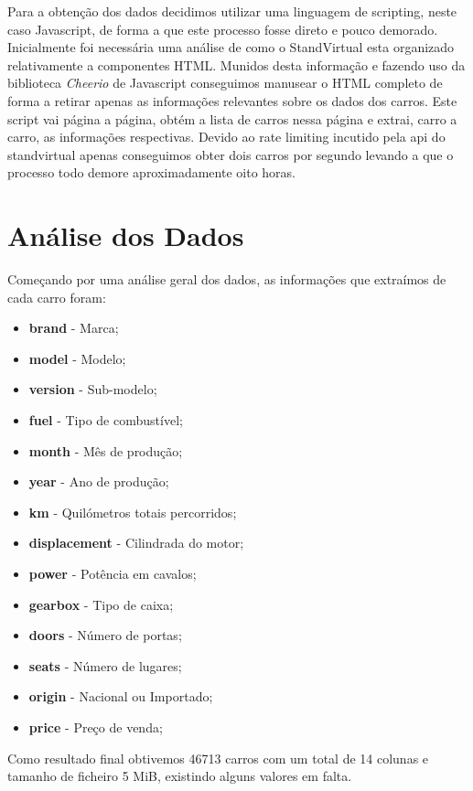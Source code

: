 \documentclass[a4paper]{report}
\begin{document}
Para a obtenção dos dados decidimos utilizar uma linguagem de scripting, neste caso Javascript,
de forma a que este processo fosse direto e pouco demorado. 
Inicialmente foi necessária uma análise de como o StandVirtual esta organizado 
relativamente a componentes HTML. Munidos desta informação e fazendo uso da biblioteca 
\textit{Cheerio} de Javascript conseguimos manusear o HTML completo de forma a retirar
apenas as informações relevantes sobre os dados dos carros.
Este script vai página a página, obtém a lista de carros nessa página e extrai,
carro a carro, as informações respectivas. Devido ao rate limiting incutido pela api do
standvirtual apenas conseguimos obter dois carros por segundo levando a que o processo todo
demore aproximadamente oito horas.

\section{Análise dos Dados}

Começando por uma análise geral dos dados, as informações que extraímos de cada carro
foram:
\begin{itemize}
    \item \textbf{brand} - Marca;
    \item \textbf{model} - Modelo;
    \item \textbf{version} - Sub-modelo;
    \item \textbf{fuel} - Tipo de combustível;
    \item \textbf{month} - Mês de produção;
    \item \textbf{year} - Ano de produção;
    \item \textbf{km} - Quilómetros totais percorridos;
    \item \textbf{displacement} - Cilindrada do motor;
    \item \textbf{power} - Potência em cavalos;
    \item \textbf{gearbox} - Tipo de caixa;
    \item \textbf{doors} - Número de portas;
    \item \textbf{seats} - Número de lugares;
    \item \textbf{origin} - Nacional ou Importado;
    \item \textbf{price} - Preço de venda;
\end{itemize}

Como resultado final obtivemos 46713 carros com um total de 14 colunas e tamanho de
ficheiro 5 MiB, existindo alguns valores em falta.
\end{document}
